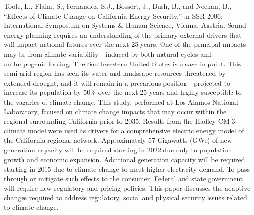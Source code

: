 \documentclass[]{article}
\begin{document}
Toole, L., Flaim, S., Fernandez, S.J., Bossert, J., Bush, B., and
Neenan, B., ``Effects of Climate Change on California Energy Security,''
in SSR 2006: International Symposium on Systems \& Human Science,
Vienna, Austria. Sound energy planning requires an understanding of the
primary external drivers that will impact national futures over the next
25 years. One of the principal impacts may be from climate
variability---induced by both natural cycles and anthropogenic forcing.
The Southwestern United States is a case in point. This semi-arid region
has seen its water and landscape resources threatened by extended
drought, and it will remain in a precarious position---projected to
increase its population by 50\% over the next 25 years and highly
susceptible to the vagaries of climate change. This study, performed at
Los Alamos National Laboratory, focused on climate change impacts that
may occur within the regional surrounding California prior to 2035.
Results from the Hadley CM-3 climate model were used as drivers for a
comprehensive electric energy model of the California regional network.
Approximately 57 Gigawatts (GWe) of new generation capacity will be
required starting in 2022 due only to population growth and economic
expansion. Additional generation capacity will be required starting in
2015 due to climate change to meet higher electricity demand. To pass
through or mitigate such effects to the consumer, Federal and state
government will require new regulatory and pricing policies. This paper
discusses the adaptive changes required to address regulatory, social
and physical security issues related to climate change.
\end{document}
